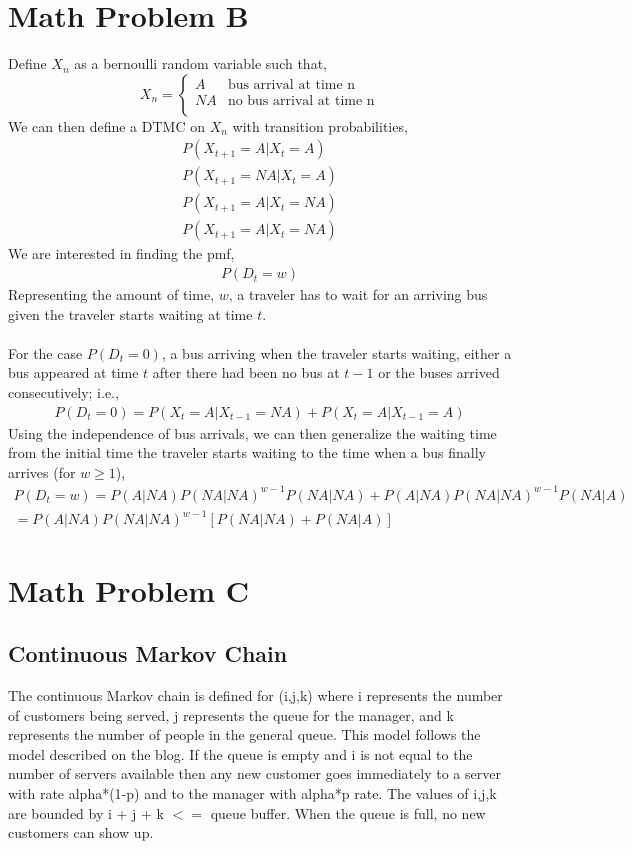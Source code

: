 \documentclass[10pt,a4paper]{article}
\begin{document}
\section{Math Problem B}
Define $X_n$ as a bernoulli random variable such that,
\[X_n = \begin{cases} 
A & \text{bus arrival at time n} \\
NA & \text{no bus arrival at time n} \\
\end{cases}\]
We can then define a DTMC on \(X_n\) with transition probabilities,
\begin{gather*}
P(X_{t+1}=A|X_t=A)\\
P(X_{t+1}=NA|X_t=A)\\
P(X_{t+1}=A|X_t=NA)\\
P(X_{t+1}=A|X_t=NA)
\end{gather*}
We are interested in finding the pmf,
\begin{align*}
P(D_t=w)
\end{align*}
Representing the amount of time, $w$, a traveler has to wait for an arriving
bus given the traveler starts waiting at time $t$.\\
\\
For the case $P(D_t=0)$, a bus arriving when the traveler starts waiting,
either a bus appeared at time $t$ after there had been no bus at $t-1$ or
the buses arrived consecutively; i.e.,
\begin{align*}
P(D_t=0)=P(X_t=A|X_{t-1}=NA)+P(X_t=A|X_{t-1}=A)
\end{align*}
Using the independence of bus arrivals, we can then generalize the waiting
time from the initial time the traveler starts waiting to the time when a
bus finally arrives (for \(w\geq1\)),
\begin{gather*}
P(D_t=w)=P(A|NA)P(NA|NA)^{w-1}P(NA|NA)+P(A|NA)P(NA|NA)^{w-1}P(NA|A)\\
=P(A|NA)P(NA|NA)^{w-1}[P(NA|NA)+P(NA|A)]
\end{gather*}
\section{Math Problem C}
\subsection{Continuous Markov Chain}
The continuous Markov chain is defined for (i,j,k) where i represents the number of customers being served, j represents the queue for the manager, and k represents the number of people in the general queue. This model follows the model described on the blog. If the queue is empty and i is not equal to the number of servers available then any new customer goes immediately to a server with rate alpha*(1-p) and to the manager with alpha*p rate. The values of i,j,k are bounded by i + j + k $<=$ queue buffer. When the queue is full, no new customers can show up.
\end{document}
